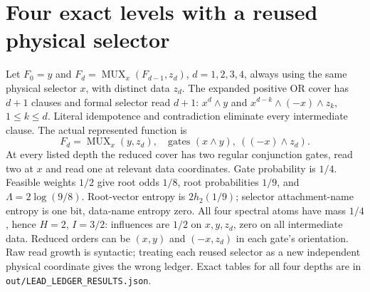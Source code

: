 \documentclass{article}
\begin{document}
\section{Four exact levels with a reused physical selector}
Let $F_0=y$ and $F_d=\operatorname{MUX}_x(F_{d-1},z_d)$, $d=1,2,3,4$,
always using the same physical selector $x$, with distinct data $z_d$.
The expanded positive OR cover has $d+1$ clauses and formal selector read
$d+1$: $x^d\wedge y$ and $x^{d-k}\wedge(-x)\wedge z_k$, $1\le k\le d$.
Literal idempotence and contradiction eliminate every intermediate clause.
The actual represented function is
\[
 F_d=\operatorname{MUX}_x(y,z_d),\quad
 \text{gates }(x\wedge y),\ ((-x)\wedge z_d).
\]
At every listed depth the reduced cover has two regular conjunction gates,
read two at $x$ and read one at relevant data coordinates. Gate probability
is $1/4$. Feasible weights $1/2$ give root odds $1/8$, root probabilities
$1/9$, and $\Lambda=2\log(9/8)$. Root-vector entropy is $2h_2(1/9)$;
selector attachment-name entropy is one bit, data-name entropy zero.
All four spectral atoms have mass $1/4$, hence $H=2$, $I=3/2$:
influences are $1/2$ on $x,y,z_d$, zero on all intermediate data.
Reduced orders can be $(x,y)$ and $(-x,z_d)$ in each gate's orientation.
Raw read growth is syntactic; treating each reused selector as a new
independent physical coordinate gives the wrong ledger. Exact tables
for all four depths are in \texttt{out/LEAD\_LEDGER\_RESULTS.json}.
\end{document}
